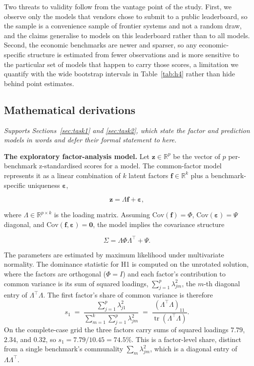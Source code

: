 Two threats to validity follow from the vantage point of the study. First, we observe only the models
that vendors chose to submit to a public leaderboard, so the sample is a convenience sample of frontier
systems and not a random draw, and the claims generalise to models on this leaderboard rather than to
all models. Second, the economic benchmarks are newer and sparser, so any economic-specific structure is
estimated from fewer observations and is more sensitive to the particular set of models that happen to
carry those scores, a limitation we quantify with the wide bootstrap intervals in Table~\ref{tab:h4}
rather than hide behind point estimates.

\subsection{Mathematical derivations}\label{app:math}
\emph{Supports Sections~\ref{sec:task1} and \ref{sec:task2}, which state the factor and prediction models
in words and defer their formal statement to here.}

\medskip
\noindent\textbf{The exploratory factor-analysis model.}
Let $\mathbf{z}\in\mathbb{R}^{p}$ be the vector of $p$ per-benchmark z-standardised scores for a model.
The common-factor model represents it as a linear combination of $k$ latent factors
$\mathbf{f}\in\mathbb{R}^{k}$ plus a benchmark-specific uniqueness $\boldsymbol{\varepsilon}$,

\[
  \mathbf{z} = \Lambda \mathbf{f} + \boldsymbol{\varepsilon},
\]

where $\Lambda\in\mathbb{R}^{p\times k}$ is the loading matrix. Assuming
$\mathrm{Cov}(\mathbf{f})=\Phi$, $\mathrm{Cov}(\boldsymbol{\varepsilon})=\Psi$ diagonal, and
$\mathrm{Cov}(\mathbf{f},\boldsymbol{\varepsilon})=\mathbf{0}$, the model implies the covariance
structure

\[
  \Sigma = \Lambda \Phi \Lambda^{\top} + \Psi .
\]

\medskip
\noindent
The parameters are estimated by maximum likelihood under multivariate normality. The dominance statistic
for H1 is computed on the unrotated solution, where the factors are orthogonal ($\Phi=I$) and each
factor's contribution to common variance is its sum of squared loadings, $\sum_{j=1}^{p}\lambda_{jm}^2$,
the $m$-th diagonal entry of $\Lambda^{\top}\Lambda$. The first factor's share of common variance is
therefore
\[
  s_1 \;=\; \frac{\sum_{j=1}^{p}\lambda_{j1}^2}{\sum_{m=1}^{k}\sum_{j=1}^{p}\lambda_{jm}^2}
        \;=\; \frac{(\Lambda^{\top}\Lambda)_{11}}{\operatorname{tr}(\Lambda^{\top}\Lambda)} .
\]
On the complete-case grid the three factors carry sums of squared loadings $7.79$, $2.34$, and $0.32$, so
$s_1 = 7.79/10.45 = 74.5\%$. This is a factor-level share, distinct from a single benchmark's communality
$\sum_{m}\lambda_{jm}^2$, which is a diagonal entry of $\Lambda\Lambda^{\top}$.

